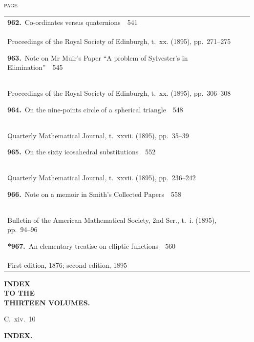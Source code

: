 \documentclass[11pt,a4paper]{book}
\newcommand{\paperentry}[4]{%
  \noindent\textbf{#1.}\ {#2}\ \dotfill\ {#3}\\[-0.2em]%
  {\small #4}\par\vspace{0.6em}%
}
\newcommand{\paperentrystar}[4]{%
  \noindent\textbf{*#1.}\ {#2}\ \dotfill\ {#3}\\[-0.2em]%
  {\small #4}\par\vspace{0.6em}%
}
\begin{document}
\newpage
\thispagestyle{fancy}
\begin{center}
{\small\textsc{page}}
\end{center}
\vspace{-0.5em}

\begin{center}
\begin{tabular}{p{4.2in}r}
\paperentry{962}{Co-ordinates versus quaternions}{541}{Proceedings of the Royal Society of Edinburgh, t.~xx. (1895), pp.~271--275}
\paperentry{963}{Note on Mr Muir's Paper ``A problem of Sylvester's in Elimination''}{545}{Proceedings of the Royal Society of Edinburgh, t.~xx. (1895), pp.~306--308}
\paperentry{964}{On the nine-points circle of a spherical triangle}{548}{Quarterly Mathematical Journal, t.~xxvii. (1895), pp.~35--39}
\paperentry{965}{On the sixty icosahedral substitutions}{552}{Quarterly Mathematical Journal, t.~xxvii. (1895), pp.~236--242}
\paperentry{966}{Note on a memoir in Smith's Collected Papers}{558}{Bulletin of the American Mathematical Society, 2nd Ser., t.~i. (1895), pp.~94--96}
\paperentrystar{967}{An elementary treatise on elliptic functions}{560}{First edition, 1876; second edition, 1895}
\end{tabular}
\end{center}

\newpage
\thispagestyle{empty}
\fancyhead[C]{}
\begin{center}
\vspace*{2em}
{\Large\bfseries INDEX}\\[0.5em]
{\large\bfseries TO THE}\\[0.5em]
{\Large\bfseries THIRTEEN VOLUMES.}
\end{center}
\vspace{2em}

\noindent\hfill{\large C.~xiv.~10}\hfill\null
\vspace{2em}

\newpage
\thispagestyle{fancy}

\begin{center}
\textbf{INDEX.}
\end{center}
\vspace{0.5em}

\begin{center}
\end{center}
\vspace{0.8em}
\end{document}
